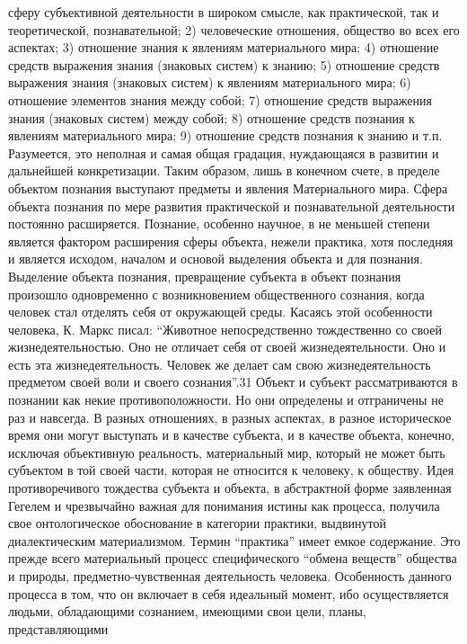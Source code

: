 \documentclass[12pt]{article}
\begin{document}
сферу субъективной деятельности в широком смысле, как практической, так и теоретической, познавательной;
2) человеческие отношения, общество во всех его аспектах; 3) отношение знания к явлениям материального
мира; 4) отношение средств выражения знания (знаковых систем) к знанию; 5) отношение средств выражения
знания (знаковых систем) к явлениям материального мира; 6) отношение элементов знания между собой; 7)
отношение  средств  выражения  знания  (знаковых  систем)  между  собой;  8)  отношение  средств  познания  к
явлениям материального мира; 9) отношение средств познания к знанию и т.п. Разумеется, это неполная и самая
общая градация, нуждающаяся в развитии и дальнейшей конкретизации. Таким образом, лишь в конечном
счете, в пределе объектом познания выступают предметы и явления Материального мира.
Сфера  объекта  познания  по  мере  развития  практической  и  познавательной  деятельности  постоянно
расширяется.  Познание,  особенно  научное,  в  не  меньшей  степени  является  фактором  расширения  сферы
объекта, нежели практика, хотя последняя и является исходом, началом и основой выделения объекта и для
познания. Выделение объекта познания, превращение субъекта в объект познания произошло одновременно с
возникновением общественного сознания, когда человек стал отделять себя от окружающей среды. Касаясь этой
особенности  человека,  К.  Маркс  писал:  “Животное  непосредственно  тождественно  со  своей
жизнедеятельностью. Оно не отличает себя от своей жизнедеятельности. Оно и есть эта жизнедеятельность.
Человек же делает сам свою жизнедеятельность предметом своей воли и своего сознания”.31
Объект  и  субъект  рассматриваются  в  познании  как  некие  противоположности.  Но  они  определены  и
отграничены не раз и навсегда. В разных отношениях, в разных аспектах, в разное историческое время они
могут выступать и в качестве субъекта, и в качестве объекта, конечно, исключая объективную реальность,
материальный мир, который не может быть субъектом в той своей части, которая не относится к человеку, к
обществу.
Идея противоречивого тождества субъекта и объекта, в абстрактной форме заявленная Гегелем и чрезвычайно
важная для понимания истины как процесса, получила свое онтологическое обоснование в категории практики,
выдвинутой диалектическим материализмом. Термин “практика” имеет емкое содержание. Это прежде всего
материальный  процесс  специфического  “обмена  веществ”  общества  и  природы,  предметно-чувственная
деятельность человека. Особенность данного процесса в том, что он включает в себя идеальный момент, ибо
осуществляется  людьми,  обладающими  сознанием,  имеющими  свои  цели,  планы,  представляющими
\end{document}
